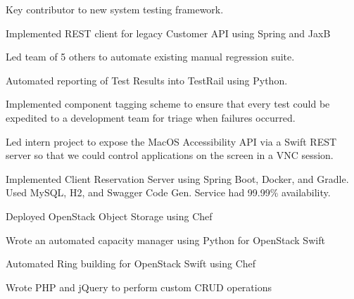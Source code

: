 \documentclass[letterpaper]{resume} %
\begin{document}
\begin{minipage}[t]{0.66\textwidth}
\sectionspace %

\begin{tightitemize}
\item Key contributor to new system testing framework.
\item Implemented REST client for legacy Customer API using Spring and JaxB
\item Led team of 5 others to automate existing manual regression suite.
\item Automated reporting of Test Results into TestRail using Python.
\item Implemented component tagging scheme to ensure that every test could be expedited to a development team for triage when failures occurred.
\item Led intern project to expose the MacOS Accessibility API via a Swift REST server so that we could control applications on the screen in a VNC session.
\item Implemented Client Reservation Server using Spring Boot, Docker, and Gradle.  Used MySQL, H2, and Swagger Code Gen.  Service had 99.99\% availability.
\end{tightitemize}

\sectionspace %

\begin{tightitemize}
\item Deployed OpenStack Object Storage using Chef
\item Wrote an automated capacity manager using Python for OpenStack Swift
\item Automated Ring building for OpenStack Swift using Chef
\end{tightitemize}

\sectionspace %



\begin{tightitemize}
\item Wrote PHP and jQuery to perform custom CRUD operations
\end{tightitemize}


\end{minipage}
\end{document}
